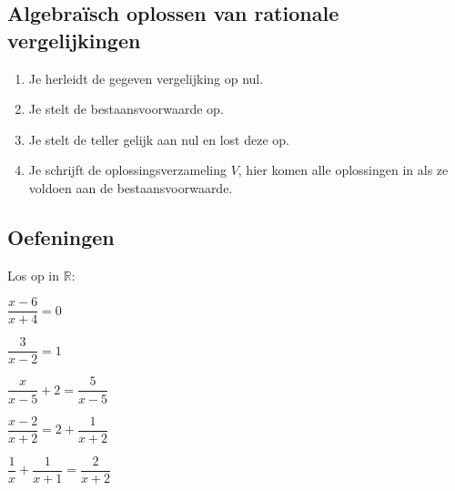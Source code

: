 \documentclass[12pt,twoside,a4paper]{article}
\begin{document}
\needspace{4cm}
\subsection{Algebraïsch oplossen van rationale vergelijkingen}
\begin{enumerate}[(1)]
\item Je herleidt de gegeven vergelijking op nul.
\item Je stelt de bestaansvoorwaarde op.
\item Je stelt de teller gelijk aan nul en lost deze op.
\item Je schrijft de oplossingsverzameling $V$, hier komen alle oplossingen in als ze voldoen aan de bestaansvoorwaarde.
\end{enumerate}

\subsection{Oefeningen}

\begin{oefening} %
Los op in $\mathbb{R}$:
\begin{exlist}{2}
\item $\dfrac{x-6}{x+4}=0$
\item $\dfrac{3}{x-2}=1$
\item $\dfrac{x}{x-5}+2=\dfrac{5}{x-5}$
\item $\dfrac{x-2}{x+2}=2+\dfrac{1}{x+2}$
\item $\dfrac{1}{x}+\dfrac{1}{x+1}=\dfrac{2}{x+2}$
\end{exlist}
\end{oefening}
\end{document}
